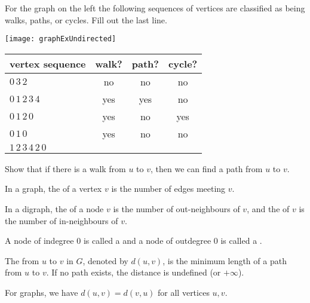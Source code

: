 \begin{Boxample}
For the graph on the left the following
sequences of vertices are classified as being walks, paths, or cycles. Fill out the last line.

\begin{minipage}[c]{0.3\textwidth}
\centering
\texttt{[image: graphExUndirected]}
\end{minipage}
\begin{minipage}[c]{0.65\textwidth}
\begin{tabular}{|l|c|c|c|}\hline
\textbf{vertex sequence} & \textbf{walk?} & \textbf{path?} & \textbf{cycle?} \\ \hline
$0\, 3\, 2$                  & no  & no  & no  \\
$0\, 1\, 2\, 3\, 4$          & yes & yes & no  \\
$0\, 1\,  2\,  0$            & yes & no  & yes  \\
$0 \, 1\,  0$                & yes & no  & no \\
$1\,  2\,  3\,  4\,  2\,  0$ &     &     &  \\
\hline
\end{tabular}
\end{minipage}
\end{Boxample}

\begin{Boxample}[8]
Show that if there is a walk from $u$ to $v$, then we can find a path from $u$ to $v$.
\end{Boxample}


\begin{Definition} 
In a graph, the  of a vertex $v$ is the number of edges meeting $v$. 

In a digraph, the  of a node $v$ is the number of out-neighbours of $v$, 
and the  of $v$ is the number of in-neighbours of $v$.

A node of indegree $0$ is called a  and a node of outdegree $0$ is called a .
\end{Definition}


\begin{Definition}
The  from $u$ to $v$ in $G$, denoted by $d(u,v)$, is 
the minimum length of a path from $u$ to $v$. If no path exists, the 
distance is undefined (or $+\infty$).
\end{Definition}

For graphs, we have $d(u,v) = d(v,u)$ for all vertices $u, v$. 

